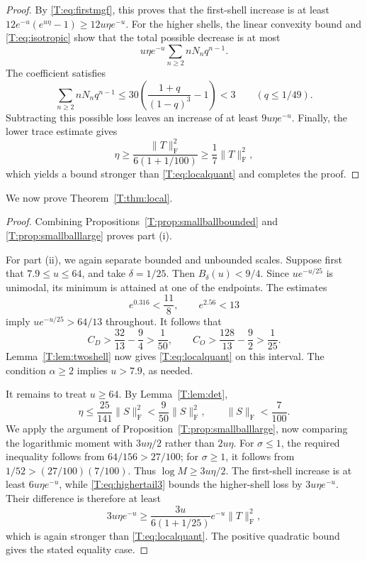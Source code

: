 \documentclass[reqno,english]{amsart}
\theoremstyle{definition}
\newtheorem{open problem}[theorem]{Open Problem}
\theoremstyle{remark}
\theoremstyle{plain}
\numberwithin{equation}{section}
\newcommand{\frob}{\mathrm F}
\begin{document}
\begin{proof}
By \eqref{T:eq:firstmgf}, this proves that the first-shell increase
is at least $12e^{-u}(e^{u\eta}-1)\ge12u\eta e^{-u}$.
For the higher shells, the linear convexity bound and
\eqref{T:eq:isotropic} show that the total possible decrease is at
most
\[
 u\eta e^{-u}\sum_{n\ge2}nN_nq^{n-1}.
\]
The coefficient satisfies
\begin{equation}\label{T:eq:highertail3}
 \sum_{n\ge2}nN_nq^{n-1}
 \le30\left(\frac{1+q}{(1-q)^3}-1\right)<3
 \qquad(q\le1/49).
\end{equation}
Subtracting this possible loss leaves an increase of at least
$9u\eta e^{-u}$. Finally, the lower trace estimate gives
\[
 \eta\ge\frac{\|T\|_{\frob}^2}{6(1+1/100)}
 \ge\frac17\|T\|_{\frob}^2,
\]
which yields a bound stronger than \eqref{T:eq:localquant} and
completes the proof.
\end{proof}


We now prove Theorem~\ref{T:thm:local}.

\begin{proof}
Combining Propositions~\ref{T:prop:smallballbounded} and
\ref{T:prop:smallballlarge} proves part (i).

For part (ii), we again separate bounded and unbounded scales.
Suppose first that $7.9\le u\le64$, and take $\delta=1/25$.
Then $B_\delta(u)<9/4$. Since $u e^{-u/25}$ is unimodal, its
minimum is attained at one of the endpoints. The estimates
\[
 e^{0.316}<\frac{11}{8},\qquad e^{2.56}<13
\]
imply $u e^{-u/25}>64/13$ throughout. It follows that
\[
 C_D>\frac{32}{13}-\frac94>\frac1{50},
 \qquad C_O>\frac{128}{13}-\frac92>\frac1{25}.
\]
Lemma~\ref{T:lem:twoshell} now gives \eqref{T:eq:localquant} on
this interval. The condition $\alpha\ge2$ implies $u>7.9$, as needed.

It remains to treat $u\ge64$. By Lemma~\ref{T:lem:det},
\[
 \eta\le\frac{25}{141}\|S\|_{\frob}^2<\frac9{50}\|S\|_{\frob}^2,
 \qquad\|S\|_{\frob}<\frac7{100}.
\]
We apply the argument of Proposition~\ref{T:prop:smallballlarge},
now comparing the logarithmic moment with $3u\eta/2$ rather than
$2u\eta$. For $\sigma\le1$, the required inequality follows from
$64/156>27/100$; for $\sigma\ge1$, it follows from
$1/52>(27/100)(7/100)$. Thus $\log M\ge3u\eta/2$.
The first-shell increase is at least $6u\eta e^{-u}$, while
\eqref{T:eq:highertail3} bounds the higher-shell loss by
$3u\eta e^{-u}$. Their difference is therefore at least
\[
 3u\eta e^{-u}\ge\frac{3u}{6(1+1/25)}e^{-u}\|T\|_{\frob}^2,
\]
which is again stronger than \eqref{T:eq:localquant}. The positive
quadratic bound gives the stated equality case.
\end{proof}
\end{document}
